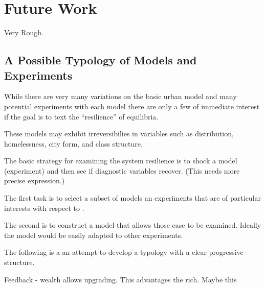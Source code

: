 \chapter{Future Work}

Very Rough.


\section{A Possible Typology of Models and Experiments}

While there  are very many variations on the basic urban model and many potential experiments with each model there are only a few of immediate interest if the goal is to text the ``resilience'' of equilibria.

These models may exhibit irreversibilies in variables such as distribution, homelessness, city form, and class structure. 


The  basic strategy for examining the system resilience is to shock a model (experiment) and then see if diagnostic variables recover. (This needs more precise expression.)


The first task is to select a subset of models an experiments that are of particular interests with respect to .

The second is to construct  a model that allows those case to be examined. Ideally the model would be easily adapted to other experiments.

The following is a an attempt to develop a typology with a clear  progressive structure.

Feedback - wealth  allows  upgrading. This advantages the rich. Maybe this 



